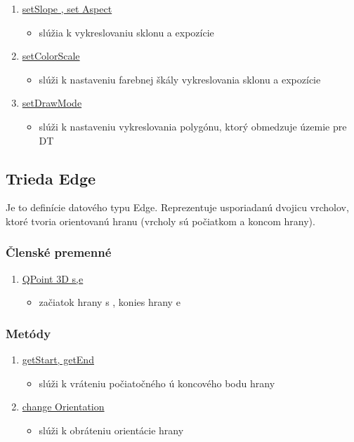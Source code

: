 \documentclass[12pt]{article}
\begin{document}
\begin{enumerate}
\item[] \underline{setSlope , set Aspect}
\begin{itemize}
\item slúžia k vykreslovaniu sklonu a expozície
\end{itemize}

\item[] \underline{setColorScale}
\begin{itemize}
\item slúži k nastaveniu farebnej škály vykreslovania sklonu a expozície
\end{itemize}

\item[] \underline{setDrawMode}
\begin{itemize}
\item slúži k nastaveniu vykreslovania polygónu, ktorý obmedzuje územie pre DT
\end{itemize}

\end{enumerate}

\subsection{Trieda Edge}
Je to definície datového typu Edge. Reprezentuje usporiadanú dvojicu vrcholov, ktoré tvoria orientovanú hranu (vrcholy sú počiatkom a koncom hrany).

\subsubsection{Členské premenné}
\begin{enumerate}

\item[] \underline {QPoint 3D s,e}
\begin{itemize}
\item začiatok hrany s , konies hrany e
\end{itemize}
\end{enumerate}

\subsubsection{Metódy}
\begin{enumerate}
\item[] \underline{getStart, getEnd}
\begin{itemize}
\item slúži k vráteniu počiatočného ú koncového bodu hrany
\end{itemize}
\item[] \underline{change Orientation}
\begin{itemize}
\item slúži k obráteniu orientácie hrany
\end{itemize}
\end{enumerate}
\end{document}
